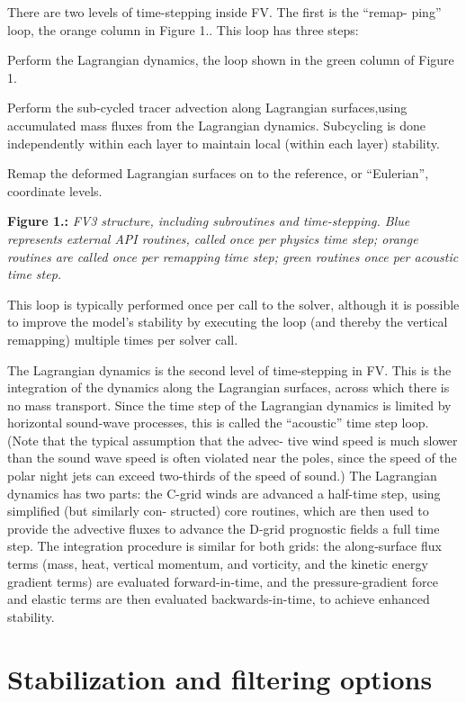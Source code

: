 There are two levels of time-\/stepping inside FV\textthreesuperior{}. The first is the “remap-\/ ping” loop, the orange column in Figure 1.. This loop has three steps\+:
\begin{DoxyEnumerate}
\item Perform the Lagrangian dynamics, the loop shown in the green column of Figure 1.
\item Perform the sub-\/cycled tracer advection along Lagrangian surfaces,using accumulated mass fluxes from the Lagrangian dynamics. Subcycling is done independently within each layer to maintain local (within each layer) stability.
\item Remap the deformed Lagrangian surfaces on to the reference, or “\+Eulerian”, coordinate levels.
\end{DoxyEnumerate}

 {\bfseries Figure 1.\+:} {\itshape F\+V3 structure, including subroutines and time-\/stepping. Blue represents external A\+PI routines, called once per physics time step; orange routines are called once per remapping time step; green routines once per acoustic time step.}

This loop is typically performed once per call to the solver, although it is possible to improve the model’s stability by executing the loop (and thereby the vertical remapping) multiple times per solver call.

The Lagrangian dynamics is the second level of time-\/stepping in FV\textthreesuperior{}. This is the integration of the dynamics along the Lagrangian surfaces, across which there is no mass transport. Since the time step of the Lagrangian dynamics is limited by horizontal sound-\/wave processes, this is called the “acoustic” time step loop. (Note that the typical assumption that the advec-\/ tive wind speed is much slower than the sound wave speed is often violated near the poles, since the speed of the polar night jets can exceed two-\/thirds of the speed of sound.) The Lagrangian dynamics has two parts\+: the C-\/grid winds are advanced a half-\/time step, using simplified (but similarly con-\/ structed) core routines, which are then used to provide the advective fluxes to advance the D-\/grid prognostic fields a full time step. The integration procedure is similar for both grids\+: the along-\/surface flux terms (mass, heat, vertical momentum, and vorticity, and the kinetic energy gradient terms) are evaluated forward-\/in-\/time, and the pressure-\/gradient force and elastic terms are then evaluated backwards-\/in-\/time, to achieve enhanced stability. \hypertarget{stabilization}{}\section{Stabilization and filtering options}\label{stabilization}
